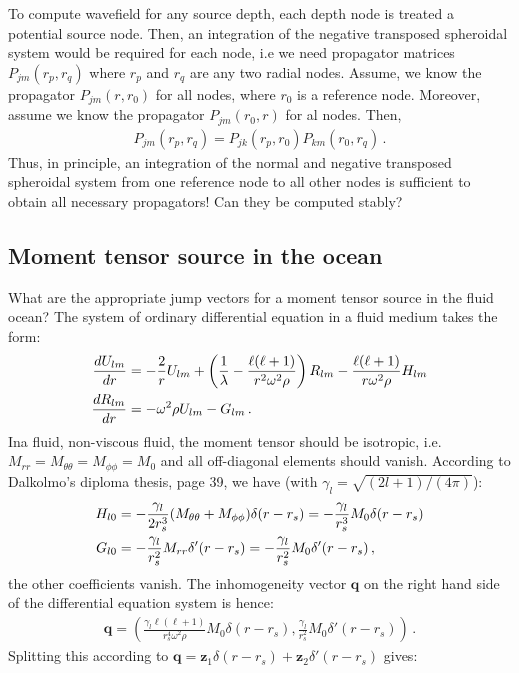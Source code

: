 \documentclass[12pt,a4paper]{article}
\begin{document}
To compute wavefield for any source depth, each depth node is treated a potential source node. Then, an integration of the negative transposed spheroidal system would be required for each node, i.e we need propagator matrices $P_{jm}(r_p,r_q)$ where $r_p$ and $r_q$ are any two radial nodes.  Assume, we know the propagator $P_{jm}(r,r_0)$ for all nodes, where $r_0$ is a reference node. Moreover, assume we know the propagator $P_{jm}(r_0,r)$ for al nodes. Then,
\begin{align}
P_{jm}(r_p,r_q) = P_{jk}(r_p,r_0)P_{km}(r_0,r_q) \,.
\end{align}
Thus, in principle, an integration of the normal and negative transposed spheroidal system from one reference node to all other nodes is sufficient to obtain all necessary propagators! Can they be computed stably?
%
\subsection{Moment tensor source in the ocean}
%
What are the appropriate jump vectors for a moment tensor source in the fluid ocean? The system of ordinary differential equation in a fluid medium takes the form:
\begin{align}
\frac{dU_{lm}}{dr} &= -\frac{2}{r}U_{lm}+\left(\frac{1}{\lambda}-\frac{\ell(\ell+1)}{r^2\omega^2\rho}\right)R_{lm}-\frac{\ell(\ell+1)}{r\omega^2\rho}H_{lm} \notag \\
\frac{dR_{lm}}{dr} &= -\omega^2\rho U_{lm}-G_{lm} \,.
\end{align}
Ina fluid, non-viscous fluid, the moment tensor should be isotropic, i.e. $M_{rr}=M_{\theta\theta}=M_{\phi\phi}=M_0$ and all off-diagonal elements should vanish. According to Dalkolmo's diploma thesis, page 39, we have (with $\gamma_l = \sqrt{(2l+1)/(4\pi)}$):
\begin{align}
H_{l0} &=  -\frac{\gamma_l}{2r_s^3}(M_{\theta\theta}+M_{\phi\phi})\delta(r-r_s) = -\frac{\gamma_l}{r_s^3}M_0\delta(r-r_s) \notag \\
G_{l0} &= -\frac{\gamma_l}{r_s^2}M_{rr}\delta'(r-r_s)  = -\frac{\gamma_l}{r_s^2}M_0\delta'(r-r_s)\,,
\end{align}
the other coefficients vanish. The inhomogeneity vector $\mathbf{q}$ on the right hand side of the differential equation system is hence:
\begin{align}
\mathbf{q} = \left(\frac{\gamma_l\ell(\ell+1)}{r_s^4\omega^2\rho}M_0\delta(r-r_s),\frac{\gamma_l}{r_s^2}M_0\delta'(r-r_s)\right) \,.
\end{align}
Splitting this according to $\mathbf{q}=\mathbf{z}_1\delta(r-r_s)+\mathbf{z}_2\delta'(r-r_s)$ gives:
\end{document}

